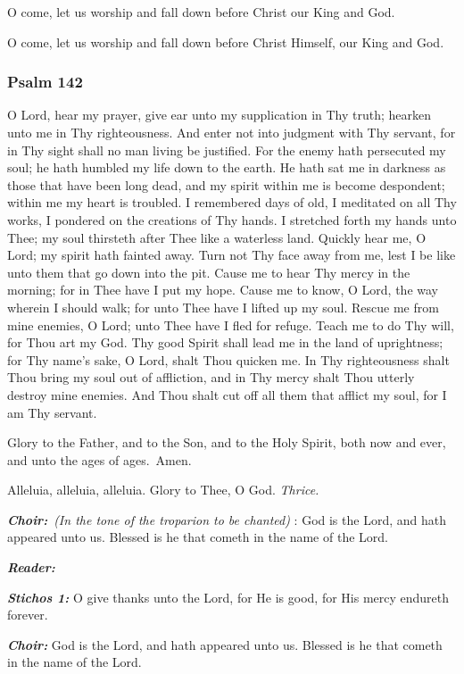 O come, let us worship and fall down before Christ our King and God.

O come, let us worship and fall down before Christ Himself, our King and God.

\subsubsection{Psalm 142}\label{psalm-142}

O Lord, hear my prayer, give ear unto my supplication in Thy truth; 
hearken unto me in Thy righteousness. And enter not into judgment with Thy servant, for in Thy sight shall no man living be justified.
 For the enemy hath persecuted my soul; 
he hath humbled my life down to the earth.
 He hath sat me in darkness as those that have been long dead, and my spirit within me is become despondent; 
within me my heart is troubled.
 I remembered days of old, I meditated on all Thy works, I pondered on the creations of Thy hands. 
I stretched forth my hands unto Thee; my soul thirsteth after Thee like a waterless land.
 Quickly hear me, O Lord; 
my spirit hath fainted away.
 Turn not Thy face away from me, lest I be like unto them that go down into the pit.
 Cause me to hear Thy mercy in the morning; 
for in Thee have I put my hope.
 Cause me to know, O Lord, the way wherein I should walk; 
for unto Thee have I lifted up my soul.
 Rescue me from mine enemies, O Lord; 
unto Thee have I fled for refuge. 
Teach me to do Thy will, for Thou art my God.
 Thy good Spirit shall lead me in the land of uprightness; 
for Thy name's sake, O Lord, shalt Thou quicken me.
 In Thy righteousness shalt Thou bring my soul out of affliction, and in Thy mercy shalt Thou utterly destroy mine enemies.
 And Thou shalt cut off all them that afflict my soul, for I am Thy servant.

Glory to the Father, and to the Son, and to the Holy Spirit, both now and ever, and unto the ages of ages.~Amen.

Alleluia, alleluia, alleluia. Glory to Thee, O God.
 \emph{Thrice.}

\textbf{\emph{Choir:}}~\emph{(In the tone of the troparion to be
chanted)}
: God is the Lord, and hath appeared unto us. Blessed is he that cometh in the name of the Lord.

\textbf{\emph{Reader:}}

\textbf{\emph{Stichos 1:}}
 O give thanks unto the Lord, for He is good, for His mercy endureth forever.

\textbf{\emph{Choir:}}
 God is the Lord, and hath appeared unto us.
 Blessed is he that cometh in the name of the Lord.

